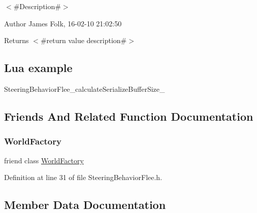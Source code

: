 $<$\#\+Description\#$>$ 

\begin{DoxyAuthor}{Author}
James Folk, 16-\/02-\/10 21\+:02\+:50
\end{DoxyAuthor}
\begin{DoxyReturn}{Returns}
$<$\#return value description\#$>$
\end{DoxyReturn}
\hypertarget{classnjli_1_1_steering_behavior_wander_ex1}{}\subsection{Lua example}\label{classnjli_1_1_steering_behavior_wander_ex1}

\begin{DoxyCodeInclude}
\end{DoxyCodeInclude}
Steering\+Behavior\+Flee\+\_\+calculate\+Serialize\+Buffer\+Size\+\_\+ 

\subsection{Friends And Related Function Documentation}
\mbox{\label{classnjli_1_1_steering_behavior_flee_acb96ebb09abe8f2a37a915a842babfac}} 
\subsubsection{\texorpdfstring{World\+Factory}{WorldFactory}}
{\footnotesize\ttfamily friend class \mbox{\hyperlink{classnjli_1_1_world_factory}{World\+Factory}}\hspace{0.3cm}{\ttfamily [friend]}}



Definition at line 31 of file Steering\+Behavior\+Flee.\+h.



\subsection{Member Data Documentation}
\mbox{\label{classnjli_1_1_steering_behavior_flee_a5ea5afe63778f21ef7039f91fee2cdad}} 
